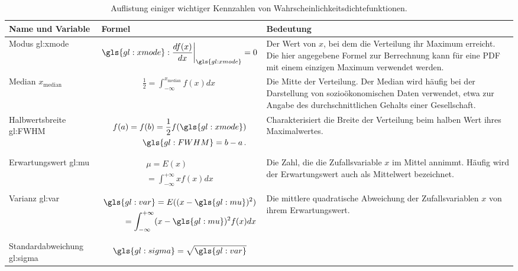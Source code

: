 \begin{longtable}{p{3cm}|p{6cm}|p{5cm}}
\caption{Auflistung einiger wichtiger Kennzahlen von Wahrscheinlichkeitsdichtefunktionen.} \\
\textbf{Name und Variable} & \textbf{Formel} & \textbf{Bedeutung} \\ \hline \hline
Modus \gls{gl:xmode} & \begin{align}
\gls{gl:xmode}: \frac{d f ( x )}{dx}\bigg|_{\gls{gl:xmode}} = 0 
\end{align} & Der Wert von $x$, bei dem die Verteilung ihr Maximum erreicht. Die hier angegebene Formel zur Berrechnung kann für eine PDF mit einem einzigen Maximum verwendet werden. \\ \hline 
Median $x_{\mathrm{median}}$ & \begin{align}
\frac{1}{2} = \int_{-\infty}^{x_{\mathrm{median}}} f ( x ) dx\
\end{align}  & Die Mitte der Verteilung. Der Median wird häufig bei der Darstellung von sozioökonomischen Daten verwendet, etwa zur Angabe des durchschnittlichen Gehalts einer Gesellschaft. \\ \hline
Halbwertsbreite  \gls{gl:FWHM} & \begin{align} \begin{split}
f ( a ) = f ( b ) = \frac{1}{2} f (\gls{gl:xmode} ) \\  \gls{gl:FWHM} = b - a\,.
\end{split} \end{align} & Charakterisiert die Breite der Verteilung beim halben Wert ihres Maximalwertes. \\ \hline
Erwartungswert \gls{gl:mu} & \begin{align} \begin{split} \mu = E(x) \\ = \int_{-\infty}^{+\infty} xf(x)dx \end{split} \end{align} & Die Zahl, die die Zufallsvariable $x$ im Mittel annimmt. Häufig wird der Erwartungswert auch als Mittelwert bezeichnet. \\ \hline
Varianz \gls{gl:var} &   \begin{align} \begin{split} \gls{gl:var} = E((x-\gls{gl:mu})^2) \\ = \int_{-\infty}^{+\infty} (x-\gls{gl:mu})^2f(x)dx \end{split} \end{align} &  Die mittlere quadratische Abweichung der Zufallsvariablen $x$ von ihrem Erwartungswert. \\ \hline
Standardabweichung \gls{gl:sigma} & \begin{align} \gls{gl:sigma} = \sqrt{\gls{gl:var}} \end{align} 
\label{tab:pdfs}
\end{longtable}

